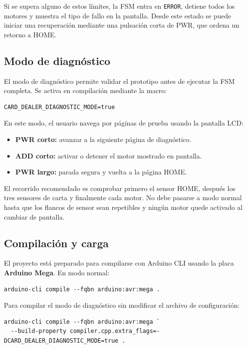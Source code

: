 Si se supera alguno de estos límites, la FSM entra en \texttt{ERROR}, detiene todos los motores y muestra el tipo de fallo en la pantalla. Desde este estado se puede iniciar una recuperación mediante una pulsación corta de PWR, que ordena un retorno a HOME.

\subsection{Modo de diagnóstico}

El modo de diagnóstico permite validar el prototipo antes de ejecutar la FSM completa. Se activa en compilación mediante la macro:

\begin{verbatim}
CARD_DEALER_DIAGNOSTIC_MODE=true
\end{verbatim}

En este modo, el usuario navega por páginas de prueba usando la pantalla LCD:

\begin{itemize}
    \item \textbf{PWR corto:} avanzar a la siguiente página de diagnóstico.
    \item \textbf{ADD corto:} activar o detener el motor mostrado en pantalla.
    \item \textbf{PWR largo:} parada segura y vuelta a la página HOME.
\end{itemize}

El recorrido recomendado es comprobar primero el sensor HOME, después los tres sensores de carta y finalmente cada motor. No debe pasarse a modo normal hasta que los flancos de sensor sean repetibles y ningún motor quede activado al cambiar de pantalla.

\subsection{Compilación y carga}

El proyecto está preparado para compilarse con Arduino CLI usando la placa \textbf{Arduino Mega}. En modo normal:

\begin{verbatim}
arduino-cli compile --fqbn arduino:avr:mega .
\end{verbatim}

Para compilar el modo de diagnóstico sin modificar el archivo de configuración:

\begin{verbatim}
arduino-cli compile --fqbn arduino:avr:mega `
  --build-property compiler.cpp.extra_flags=-DCARD_DEALER_DIAGNOSTIC_MODE=true .
\end{verbatim}

